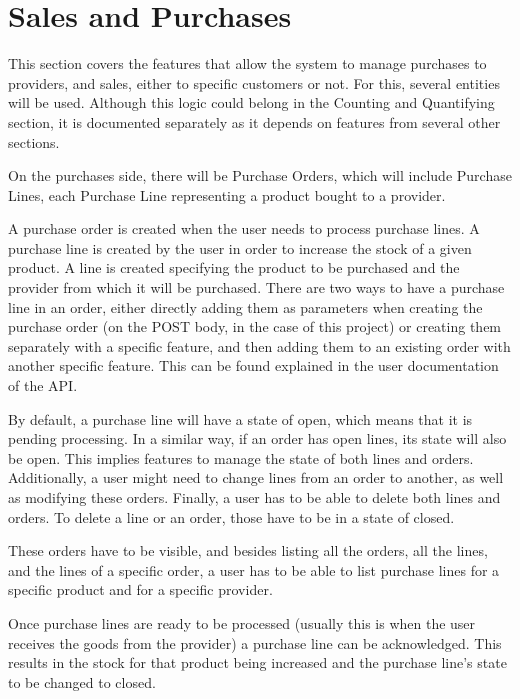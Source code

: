 \section{Sales and Purchases}
This section covers the features that allow the system to manage purchases to providers, and sales, either to specific customers or not. For this, several entities will be used. Although this logic could belong in the Counting and Quantifying section, it is documented separately as it depends on features from several other sections. 

On the purchases side, there will be Purchase Orders, which will include Purchase Lines, each Purchase Line representing a product bought to a provider.

A purchase order is created when the user needs to process purchase lines. A purchase line is created by the user in order to increase the stock of a given product. A line is created specifying the product to be purchased and the provider from which it will be purchased. There are two ways to have a purchase line in an order, either directly adding them as parameters when creating the purchase order (on the POST body, in the case of this project) or creating them separately with a specific feature, and then adding them to an existing order with another specific feature. This can be found explained in the user documentation of the API.

By default, a purchase line will have a state of open, which means that it is pending processing. In a similar way, if an order has open lines, its state will also be open. This implies features to manage the state of both lines and orders. Additionally, a user might need to change lines from an order to another, as well as modifying these orders. Finally, a user has to be able to delete both lines and orders. To delete a line or an order, those have to be in a state of closed.

These orders have to be visible, and besides listing all the orders, all the lines, and the lines of a specific order, a user has to be able to list purchase lines for a specific product and for a specific provider.

Once purchase lines are ready to be processed (usually this is when the user receives the goods from the provider) a purchase line can be acknowledged. This results in the stock for that product being increased and the purchase line’s state to be changed to closed.

